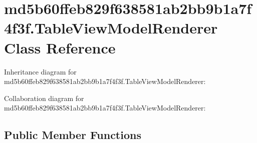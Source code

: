 \hypertarget{classmd5b60ffeb829f638581ab2bb9b1a7f4f3f_1_1_table_view_model_renderer}{}\section{md5b60ffeb829f638581ab2bb9b1a7f4f3f.\+Table\+View\+Model\+Renderer Class Reference}
\label{classmd5b60ffeb829f638581ab2bb9b1a7f4f3f_1_1_table_view_model_renderer}


Inheritance diagram for md5b60ffeb829f638581ab2bb9b1a7f4f3f.\+Table\+View\+Model\+Renderer\+:


Collaboration diagram for md5b60ffeb829f638581ab2bb9b1a7f4f3f.\+Table\+View\+Model\+Renderer\+:
\subsection*{Public Member Functions}
